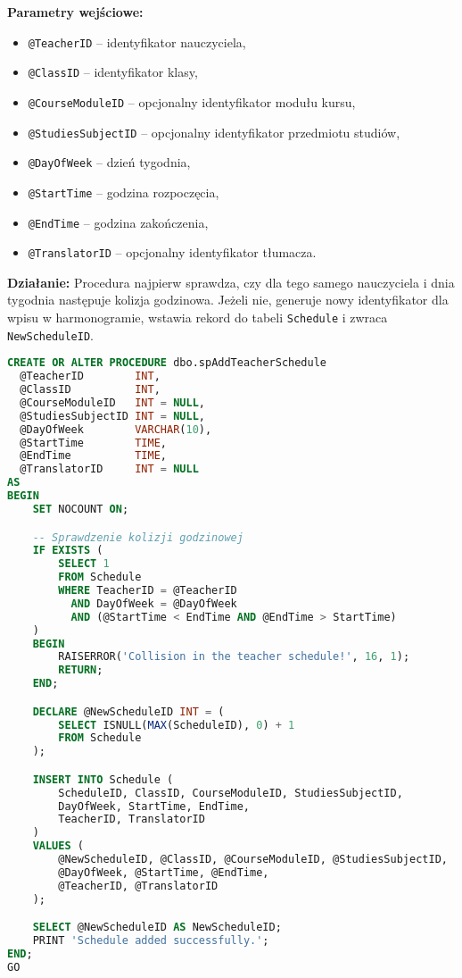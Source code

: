 \documentclass[12pt]{article}
\begin{document}
\textbf{Parametry wejściowe:}
\begin{itemize}
  \item \texttt{@TeacherID} – identyfikator nauczyciela,
  \item \texttt{@ClassID} – identyfikator klasy,
  \item \texttt{@CourseModuleID} – opcjonalny identyfikator modułu kursu,
  \item \texttt{@StudiesSubjectID} – opcjonalny identyfikator przedmiotu studiów,
  \item \texttt{@DayOfWeek} – dzień tygodnia,
  \item \texttt{@StartTime} – godzina rozpoczęcia,
  \item \texttt{@EndTime} – godzina zakończenia,
  \item \texttt{@TranslatorID} – opcjonalny identyfikator tłumacza.
\end{itemize}

\textbf{Działanie:} Procedura najpierw sprawdza, czy dla tego samego nauczyciela i dnia tygodnia następuje kolizja godzinowa. Jeżeli nie, generuje nowy identyfikator dla wpisu w harmonogramie, wstawia rekord do tabeli \verb|Schedule| i zwraca \verb|NewScheduleID|.

\begin{lstlisting}[language=SQL]
CREATE OR ALTER PROCEDURE dbo.spAddTeacherSchedule
  @TeacherID        INT,
  @ClassID          INT,
  @CourseModuleID   INT = NULL,
  @StudiesSubjectID INT = NULL,
  @DayOfWeek        VARCHAR(10),
  @StartTime        TIME,
  @EndTime          TIME,
  @TranslatorID     INT = NULL
AS
BEGIN
    SET NOCOUNT ON;

    -- Sprawdzenie kolizji godzinowej
    IF EXISTS (
        SELECT 1
        FROM Schedule
        WHERE TeacherID = @TeacherID
          AND DayOfWeek = @DayOfWeek
          AND (@StartTime < EndTime AND @EndTime > StartTime)
    )
    BEGIN
        RAISERROR('Collision in the teacher schedule!', 16, 1);
        RETURN;
    END;

    DECLARE @NewScheduleID INT = (
        SELECT ISNULL(MAX(ScheduleID), 0) + 1
        FROM Schedule
    );

    INSERT INTO Schedule (
        ScheduleID, ClassID, CourseModuleID, StudiesSubjectID,
        DayOfWeek, StartTime, EndTime,
        TeacherID, TranslatorID
    )
    VALUES (
        @NewScheduleID, @ClassID, @CourseModuleID, @StudiesSubjectID,
        @DayOfWeek, @StartTime, @EndTime,
        @TeacherID, @TranslatorID
    );

    SELECT @NewScheduleID AS NewScheduleID;
    PRINT 'Schedule added successfully.';
END;
GO
\end{lstlisting}
\end{document}
